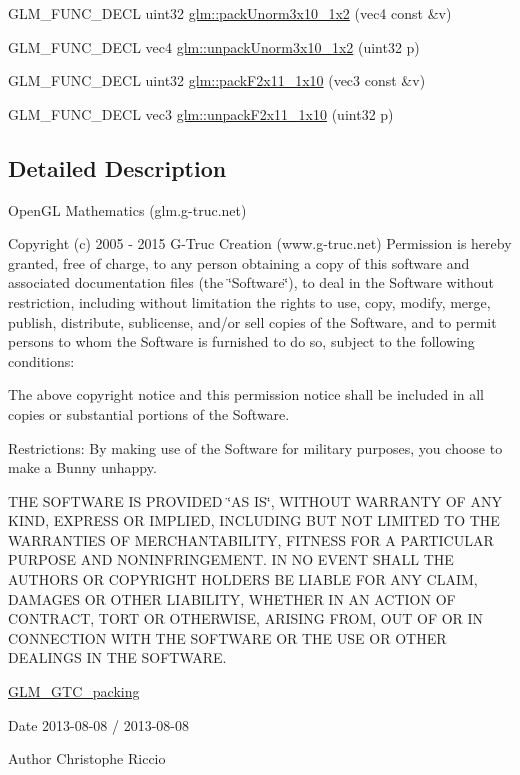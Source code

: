 \begin{DoxyCompactItemize}
\item 
G\-L\-M\-\_\-\-F\-U\-N\-C\-\_\-\-D\-E\-C\-L uint32 \hyperlink{group__gtc__packing_ga2cf2d11b40bd48639110456fd74c2e33}{glm\-::pack\-Unorm3x10\-\_\-1x2} (vec4 const \&v)
\item 
G\-L\-M\-\_\-\-F\-U\-N\-C\-\_\-\-D\-E\-C\-L vec4 \hyperlink{group__gtc__packing_gaf69ace2b5e9234f8afb4e99c3df1193d}{glm\-::unpack\-Unorm3x10\-\_\-1x2} (uint32 p)
\item 
G\-L\-M\-\_\-\-F\-U\-N\-C\-\_\-\-D\-E\-C\-L uint32 \hyperlink{group__gtc__packing_ga8c2a0eeee677ca4dafd9e093d9e81062}{glm\-::pack\-F2x11\-\_\-1x10} (vec3 const \&v)
\item 
G\-L\-M\-\_\-\-F\-U\-N\-C\-\_\-\-D\-E\-C\-L vec3 \hyperlink{group__gtc__packing_ga8b9c7991eb021d95c778bf5c0b2f7824}{glm\-::unpack\-F2x11\-\_\-1x10} (uint32 p)
\end{DoxyCompactItemize}


\subsection{Detailed Description}
Open\-G\-L Mathematics (glm.\-g-\/truc.\-net)

Copyright (c) 2005 -\/ 2015 G-\/\-Truc Creation (www.\-g-\/truc.\-net) Permission is hereby granted, free of charge, to any person obtaining a copy of this software and associated documentation files (the \char`\"{}\-Software\char`\"{}), to deal in the Software without restriction, including without limitation the rights to use, copy, modify, merge, publish, distribute, sublicense, and/or sell copies of the Software, and to permit persons to whom the Software is furnished to do so, subject to the following conditions\-:

The above copyright notice and this permission notice shall be included in all copies or substantial portions of the Software.

Restrictions\-: By making use of the Software for military purposes, you choose to make a Bunny unhappy.

T\-H\-E S\-O\-F\-T\-W\-A\-R\-E I\-S P\-R\-O\-V\-I\-D\-E\-D \char`\"{}\-A\-S I\-S\char`\"{}, W\-I\-T\-H\-O\-U\-T W\-A\-R\-R\-A\-N\-T\-Y O\-F A\-N\-Y K\-I\-N\-D, E\-X\-P\-R\-E\-S\-S O\-R I\-M\-P\-L\-I\-E\-D, I\-N\-C\-L\-U\-D\-I\-N\-G B\-U\-T N\-O\-T L\-I\-M\-I\-T\-E\-D T\-O T\-H\-E W\-A\-R\-R\-A\-N\-T\-I\-E\-S O\-F M\-E\-R\-C\-H\-A\-N\-T\-A\-B\-I\-L\-I\-T\-Y, F\-I\-T\-N\-E\-S\-S F\-O\-R A P\-A\-R\-T\-I\-C\-U\-L\-A\-R P\-U\-R\-P\-O\-S\-E A\-N\-D N\-O\-N\-I\-N\-F\-R\-I\-N\-G\-E\-M\-E\-N\-T. I\-N N\-O E\-V\-E\-N\-T S\-H\-A\-L\-L T\-H\-E A\-U\-T\-H\-O\-R\-S O\-R C\-O\-P\-Y\-R\-I\-G\-H\-T H\-O\-L\-D\-E\-R\-S B\-E L\-I\-A\-B\-L\-E F\-O\-R A\-N\-Y C\-L\-A\-I\-M, D\-A\-M\-A\-G\-E\-S O\-R O\-T\-H\-E\-R L\-I\-A\-B\-I\-L\-I\-T\-Y, W\-H\-E\-T\-H\-E\-R I\-N A\-N A\-C\-T\-I\-O\-N O\-F C\-O\-N\-T\-R\-A\-C\-T, T\-O\-R\-T O\-R O\-T\-H\-E\-R\-W\-I\-S\-E, A\-R\-I\-S\-I\-N\-G F\-R\-O\-M, O\-U\-T O\-F O\-R I\-N C\-O\-N\-N\-E\-C\-T\-I\-O\-N W\-I\-T\-H T\-H\-E S\-O\-F\-T\-W\-A\-R\-E O\-R T\-H\-E U\-S\-E O\-R O\-T\-H\-E\-R D\-E\-A\-L\-I\-N\-G\-S I\-N T\-H\-E S\-O\-F\-T\-W\-A\-R\-E.

\hyperlink{group__gtc__packing}{G\-L\-M\-\_\-\-G\-T\-C\-\_\-packing}

\begin{DoxyDate}{Date}
2013-\/08-\/08 / 2013-\/08-\/08 
\end{DoxyDate}
\begin{DoxyAuthor}{Author}
Christophe Riccio 
\end{DoxyAuthor}
